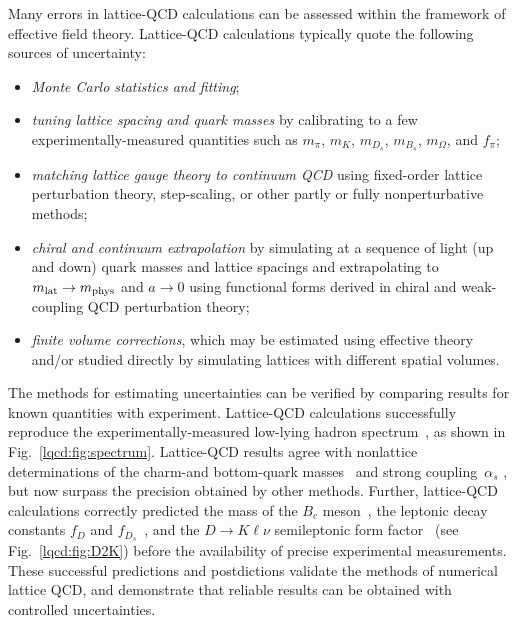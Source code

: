 Many errors in lattice-QCD calculations can be assessed within the framework
of effective field theory.  Lattice-QCD calculations typically quote the
following sources of uncertainty:
%
\begin{itemize}
\item \emph{Monte Carlo statistics and fitting};
\item \emph{tuning lattice spacing and quark masses} by calibrating to a few experimentally-measured 
quantities such as $m_\pi$, $m_K$, $m_{D_s}$, $m_{B_s}$, $m_\Omega$, and $f_\pi$;
\item \emph{matching lattice gauge theory to continuum QCD} using fixed-order lattice perturbation theory, 
step-scaling, or other partly or fully nonperturbative methods;
\item \emph{chiral and continuum extrapolation} by simulating at a sequence of light (up and down) quark
masses and lattice spacings and extrapolating to $m_{\rm lat} \to m_{\rm phys}$ and $a\to0$ using functional
forms derived in chiral and weak-coupling QCD perturbation theory;
\item \emph{finite volume corrections}, which may be estimated using effective theory and/or studied directly 
by simulating lattices with different spatial volumes.
\end{itemize}
%
The methods for estimating uncertainties can be verified by comparing results
for known quantities with experiment.  Lattice-QCD calculations successfully
reproduce the experimentally-measured low-lying hadron
spectrum~\cite{Aubin:2004wf,Aoki:2008sm,Durr:2008zz,Bazavov:2009bb,Christ:2010dd,Bernard:2010fr,Gregory:2010gm,Dudek:2011tt,Bietenholz:2011qq,Mohler:2011ke,Gregory:2011sg},
as shown in Fig.~\ref{lqcd:fig:spectrum}.  Lattice-QCD results agree with
nonlattice determinations of the charm-and bottom-quark
masses~\cite{Chetyrkin:2009fv,McNeile:2010ji,Beringer:1900zz} and strong
coupling~$\alpha_s$
\cite{McNeile:2010ji,Allison:2008xk,Davies:2008sw,Aoki:2009tf,Shintani:2010ph,Bethke:2011tr,Blossier:2012ef},
but now surpass the precision obtained by other methods.  Further, lattice-QCD
calculations correctly predicted the mass of the $B_c$
meson~\cite{Allison:2004be,Abulencia:2005usa}, the leptonic decay constants
$f_D$ and $f_{D_s}$~\cite{Aubin:2005ar,Artuso:2005ym}, and the $D\to K \ell
\nu$ semileptonic form factor~\cite{Aubin:2004ej,Widhalm:2006wz} (see
Fig.~\ref{lqcd:fig:D2K}) before the availability of precise experimental
measurements.  These successful predictions and postdictions validate the
methods of numerical lattice QCD, and demonstrate that reliable results can be
obtained with controlled uncertainties.

